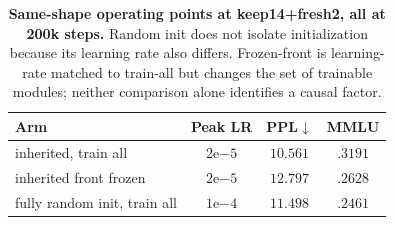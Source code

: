 \begin{table}[t]
\centering
\small
\setlength{\tabcolsep}{4pt}
\begin{tabular}{@{}lccc@{}}
\toprule
\textbf{Arm} & \textbf{Peak LR} & \textbf{PPL}$\downarrow$ & \textbf{MMLU} \\
\midrule
inherited, train all & $2\mathrm{e}{-5}$ & $10.561$ & $.3191$ \\
inherited front frozen & $2\mathrm{e}{-5}$ & $12.797$ & $.2628$ \\
fully random init, train all & $1\mathrm{e}{-4}$ & $11.498$ & $.2461$ \\
\bottomrule
\end{tabular}
\caption{\textbf{Same-shape operating points at keep14+fresh2, all at 200k
steps.} Random init does not isolate initialization because its learning rate
also differs. Frozen-front is learning-rate matched to train-all but changes the
set of trainable modules; neither comparison alone identifies a causal factor.}
\label{tab:control}
\end{table}
